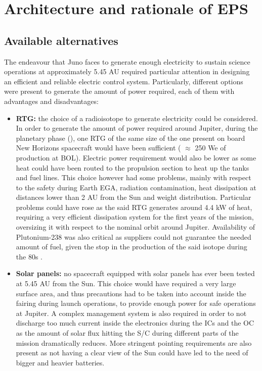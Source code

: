 \section{Architecture and rationale of EPS}
\label{sec:EPS_architecture_rationale}

\subsection{Available alternatives}
\label{subsec:available_alternatives}

The endeavour that Juno faces to generate enough electricity to sustain science operations at approximately 5.45 AU required particular attention in designing an efficient and reliable electric control system. Particularly, different options were present to generate the amount of power required, each of them with advantages and disadvantages:

\begin{itemize}
    \item \textbf{RTG:} the choice of a radioisotope to generate electricity could be considered. In order to generate the amount of power required around Jupiter, during the planetary phase 
    (\mref), 
    one RTG of the same size of the one present on board New Horizons spacecraft  would have been sufficient ( $\approx$ 250 We of production at BOL)\cite{nh_rtg}. Electric power requirement would also be lower as some heat could have been routed to the propulsion section to heat up the tanks and fuel lines. This choice however had some problems, mainly with respect to the safety during Earth EGA, radiation contamination, heat dissipation at distances lower than 2 AU from the Sun and weight distribution. Particular problems could have rose as the said RTG generates around 4.4 kW of heat, requiring a very efficient dissipation system for the first years of the mission, oversizing it with respect to the nominal orbit around Jupiter. Availability of Plutonium-238 was also critical as suppliers could not guarantee the needed amount of fuel, given the stop in the production of the said isotope during the 80s \cite{plutonium}. 
    
    \item \textbf{Solar panels:} no spacecraft equipped with solar panels has ever been tested at 5.45 AU from the Sun. This choice would have required a very large surface area, and thus precautions had to be taken into account inside the fairing during launch operations, to provide enough power for safe operations at Jupiter. A complex management system is also required in order to not discharge too much current inside the electronics during the ICs and the OC as the amount of solar flux hitting the S/C during different parts of the mission dramatically reduces. More stringent pointing requirements are also present as not having a clear view of the Sun could have led to the need of bigger and heavier batteries. 
\end{itemize}

